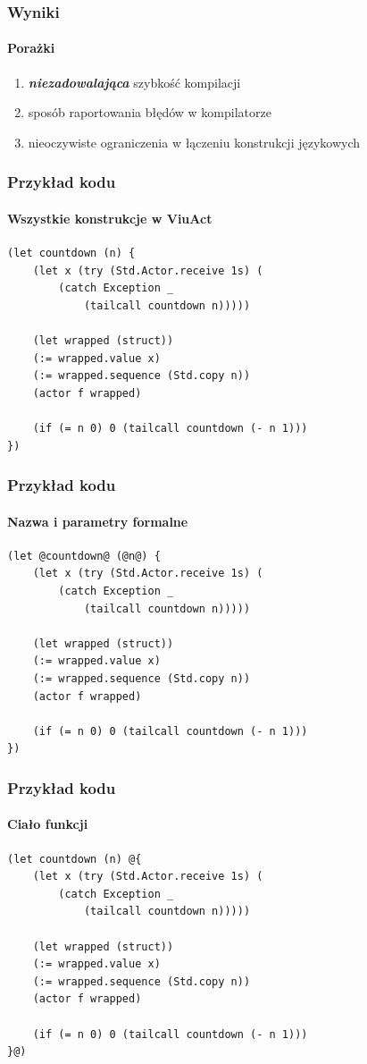 \documentclass[aspectratio=169]{beamer}
\begin{document}
\begin{frame}
    \frametitle{Wyniki}
    \framesubtitle{Porażki}

    \begin{enumerate}
        \item \emph{\textbf{niezadowalająca}} szybkość kompilacji
        \item sposób raportowania błędów w kompilatorze
        \item nieoczywiste ograniczenia w łączeniu konstrukcji językowych
    \end{enumerate}
\end{frame}

\begin{frame}[fragile]
    \frametitle{Przykład kodu}
    \framesubtitle{Wszystkie konstrukcje w ViuAct}

    \begin{small}
    \begin{lstlisting}
(let countdown (n) {
    (let x (try (Std.Actor.receive 1s) (
        (catch Exception _
            (tailcall countdown n)))))

    (let wrapped (struct))
    (:= wrapped.value x)
    (:= wrapped.sequence (Std.copy n))
    (actor f wrapped)

    (if (= n 0) 0 (tailcall countdown (- n 1)))
})
    \end{lstlisting}
    \end{small}
\end{frame}

\begin{frame}[fragile]
    \frametitle{Przykład kodu}
    \framesubtitle{Nazwa i parametry formalne}

    \begin{small}
    \begin{lstlisting}
(let @countdown@ (@n@) {
    (let x (try (Std.Actor.receive 1s) (
        (catch Exception _
            (tailcall countdown n)))))

    (let wrapped (struct))
    (:= wrapped.value x)
    (:= wrapped.sequence (Std.copy n))
    (actor f wrapped)

    (if (= n 0) 0 (tailcall countdown (- n 1)))
})
    \end{lstlisting}
    \end{small}
\end{frame}

\begin{frame}[fragile]
    \frametitle{Przykład kodu}
    \framesubtitle{Ciało funkcji}

    \begin{small}
    \begin{lstlisting}
(let countdown (n) @{
    (let x (try (Std.Actor.receive 1s) (
        (catch Exception _
            (tailcall countdown n)))))

    (let wrapped (struct))
    (:= wrapped.value x)
    (:= wrapped.sequence (Std.copy n))
    (actor f wrapped)

    (if (= n 0) 0 (tailcall countdown (- n 1)))
}@)
    \end{lstlisting}
    \end{small}
\end{frame}
\end{document}
